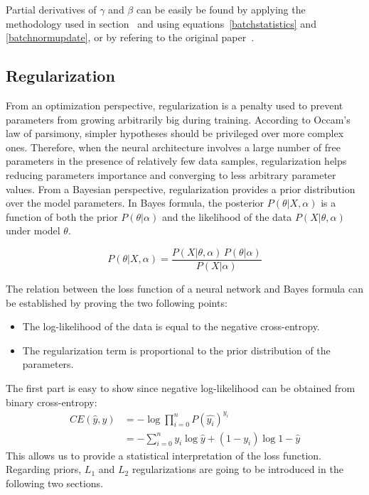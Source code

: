         Partial derivatives of $\gamma$ and $\beta$ can be easily be found by applying the methodology used in
        section~\label{backpropagation} and using equations~\ref{batchstatistics} and \ref{batchnormupdate},
        or by refering to the original paper~\cite{DBLP:journals/corr/IoffeS15}.

    \subsection{Regularization}

    	From an optimization perspective, regularization is a penalty used to prevent
    	parameters from growing arbitrarily big during training.
    	According to Occam's law of parsimony, simpler hypotheses should be privileged over more complex ones.
    	Therefore, when the neural architecture involves a large number of free parameters
    	in the presence of relatively few data samples,
    	regularization helps reducing parameters importance and converging to less arbitrary parameter values.
    	From a Bayesian perspective, regularization provides a prior distribution over the model parameters.
    	In Bayes formula, the posterior $P(\theta \vert X, \alpha)$ is a function of both the prior
    	$P(\theta \vert \alpha)$ and the likelihood of the data $P(X \vert \theta, \alpha)$ under model $\theta$.

    	\begin{equation}
    	    P(\theta \vert X, \alpha) = \frac{P(X \vert \theta, \alpha)\,P(\theta \vert \alpha)}{P(X \vert \alpha)}
    	\end{equation}

    	The relation between the loss function of a neural network and Bayes formula can be established
    	by proving the two following points:

    	\begin{itemize}
    	    \item The log-likelihood of the data is equal to the negative cross-entropy.
    	    \item The regularization term is proportional to the prior distribution of the parameters.
    	\end{itemize}

    	The first part is easy to show since negative log-likelihood can be obtained from binary cross-entropy:
    	\begin{align}
    		CE(\hat{y}, y) & = - \log{\prod\limits_{i=0}^n P(\hat{y_i})^{y_i}}  \\
    		& = -\sum\limits_{i=0}^n y_i \log{\hat{y}} + (1 - y_i) \log{1 - \hat{y}}
    	\end{align}
    	This allows us to provide a statistical interpretation of the loss function.
    	Regarding priors, $L_1$ and $L_2$ regularizations are going to be introduced in the following two sections.

